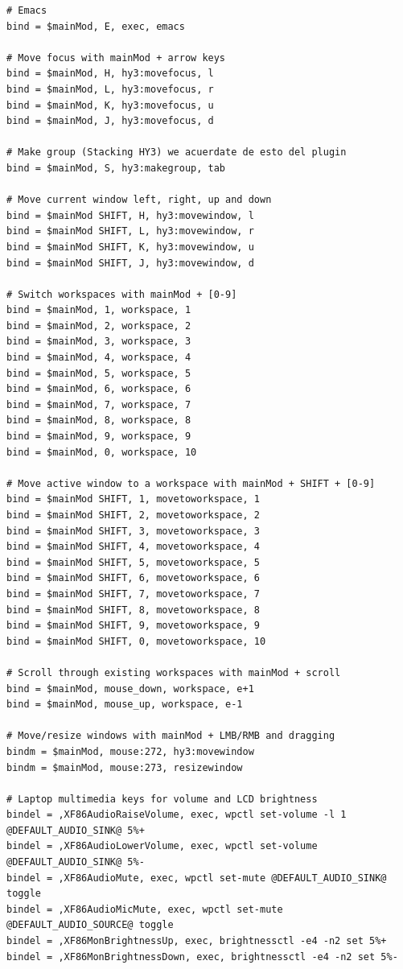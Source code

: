 \documentclass[11pt]{article}
\begin{document}
\begin{verbatim}
# Emacs
bind = $mainMod, E, exec, emacs

# Move focus with mainMod + arrow keys
bind = $mainMod, H, hy3:movefocus, l
bind = $mainMod, L, hy3:movefocus, r
bind = $mainMod, K, hy3:movefocus, u
bind = $mainMod, J, hy3:movefocus, d

# Make group (Stacking HY3) we acuerdate de esto del plugin
bind = $mainMod, S, hy3:makegroup, tab

# Move current window left, right, up and down
bind = $mainMod SHIFT, H, hy3:movewindow, l
bind = $mainMod SHIFT, L, hy3:movewindow, r
bind = $mainMod SHIFT, K, hy3:movewindow, u
bind = $mainMod SHIFT, J, hy3:movewindow, d

# Switch workspaces with mainMod + [0-9]
bind = $mainMod, 1, workspace, 1
bind = $mainMod, 2, workspace, 2
bind = $mainMod, 3, workspace, 3
bind = $mainMod, 4, workspace, 4
bind = $mainMod, 5, workspace, 5
bind = $mainMod, 6, workspace, 6
bind = $mainMod, 7, workspace, 7
bind = $mainMod, 8, workspace, 8
bind = $mainMod, 9, workspace, 9
bind = $mainMod, 0, workspace, 10

# Move active window to a workspace with mainMod + SHIFT + [0-9]
bind = $mainMod SHIFT, 1, movetoworkspace, 1
bind = $mainMod SHIFT, 2, movetoworkspace, 2
bind = $mainMod SHIFT, 3, movetoworkspace, 3
bind = $mainMod SHIFT, 4, movetoworkspace, 4
bind = $mainMod SHIFT, 5, movetoworkspace, 5
bind = $mainMod SHIFT, 6, movetoworkspace, 6
bind = $mainMod SHIFT, 7, movetoworkspace, 7
bind = $mainMod SHIFT, 8, movetoworkspace, 8
bind = $mainMod SHIFT, 9, movetoworkspace, 9
bind = $mainMod SHIFT, 0, movetoworkspace, 10

# Scroll through existing workspaces with mainMod + scroll
bind = $mainMod, mouse_down, workspace, e+1
bind = $mainMod, mouse_up, workspace, e-1

# Move/resize windows with mainMod + LMB/RMB and dragging
bindm = $mainMod, mouse:272, hy3:movewindow
bindm = $mainMod, mouse:273, resizewindow

# Laptop multimedia keys for volume and LCD brightness
bindel = ,XF86AudioRaiseVolume, exec, wpctl set-volume -l 1 @DEFAULT_AUDIO_SINK@ 5%+
bindel = ,XF86AudioLowerVolume, exec, wpctl set-volume @DEFAULT_AUDIO_SINK@ 5%-
bindel = ,XF86AudioMute, exec, wpctl set-mute @DEFAULT_AUDIO_SINK@ toggle
bindel = ,XF86AudioMicMute, exec, wpctl set-mute @DEFAULT_AUDIO_SOURCE@ toggle
bindel = ,XF86MonBrightnessUp, exec, brightnessctl -e4 -n2 set 5%+
bindel = ,XF86MonBrightnessDown, exec, brightnessctl -e4 -n2 set 5%-


\end{verbatim}
\end{document}
